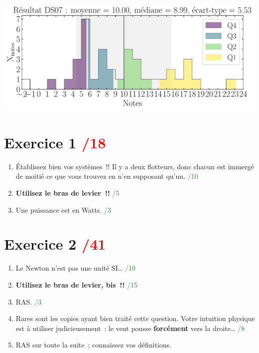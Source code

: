 \documentclass[a4paper, 10pt, final, garamond]{book}
\begin{document}
\begin{center}
    \includegraphics[width=.8\linewidth]{res_DS07.pdf}
\end{center}
\vspace*{-20pt}

\section{Exercice 1 \hfill \textcolor{red}{/18}}
\begin{enumerate}
  \item Établissez bien vos systèmes~!! Il y a deux flotteurs, donc chacun est
    immergé de moitié ce que vous trouvez en n'en supposant qu'un.
    \hfill \textcolor{ForestGreen}{/10}
  \item \textbf{Utilisez le bras de levier~!!}
    \hfill \textcolor{ForestGreen}{/5}
  \item Une puissance est en Watts.
    \hfill \textcolor{ForestGreen}{/3}
\end{enumerate}

\section{Exercice 2 \hfill \textcolor{red}{/41}}
\begin{enumerate}
  \item Le Newton n'est pas une unité SI…
    \hfill \textcolor{ForestGreen}{/10}
  \item \textbf{Utilisez le bras de levier, bis~!!}
    \hfill \textcolor{ForestGreen}{/15}
  \item RAS.
    \hfill \textcolor{ForestGreen}{/3}
  \item Rares sont les copies ayant bien traité cette question. Votre intuition
    physique est à utiliser judicieusement~: le vent pousse \textbf{forcément}
    vers la droite…
    \hfill \textcolor{ForestGreen}{/8}
  \item RAS sur toute la suite~; connaissez vos définitions.
\end{enumerate}
\end{document}
